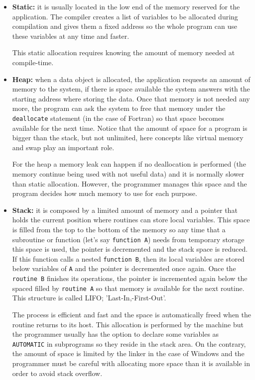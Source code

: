 \begin{itemize}
    \item \textbf{Static:} it is usually located in the low end of the memory reserved for the application. The compiler creates a list of variables to be allocated during compilation and gives them a fixed address 
    so the whole program can use these variables at any time and faster. 
    
    This static allocation requires knowing the amount of memory needed at compile-time.
    
    \item \textbf{Heap:} when a data object is allocated, the application requests an amount of memory to the system, if there is space available the system answers with the 
    starting address where storing the data. Once that memory is not needed any more, the program can ask the system to free that memory under the \texttt{deallocate} statement (in the case of Fortran) so
    that space becomes available for the next time. Notice that the amount of space for a program is bigger than the stack, but not unlimited, here concepts like virtual memory and swap play an important role. 
    
    For the heap a memory leak can happen if no deallocation is performed (the memory continue being used with not useful data) and it is normally slower than static allocation. 
    However, the programmer manages this space and the program decides how much memory to use for each purpose. 
    
    \item \textbf{Stack:} it is composed by a limited amount of memory and a pointer that holds the current position where routines can store local variables. This space is filled from the top to the bottom of the memory so any time that a subroutine or function (let's say \texttt{function A}) needs from temporary storage this space is used, the pointer is decremented and the stack space is reduced. If this function calls a nested \texttt{function B}, then its local variables are stored below variables of \texttt{A} and the pointer is decremented once again. Once the \texttt{routine B} finishes its operations, the pointer is incremented again below the spaced filled by \texttt{routine A} so that memory is available for the next routine. This structure is called LIFO; 'Last-In,-First-Out'.  
    
    The process is efficient and fast and the space is automatically freed when the routine returns to its host. This allocation is performed by the machine but the programmer usually has the option to declare some variables as \texttt{AUTOMATIC} in subprograms so they reside in the stack area. On the contrary, the amount of space is limited by the linker in the case of Windows and the programmer must be careful with allocating more space than it is available in order to avoid stack overflow. 
        
\end{itemize}


